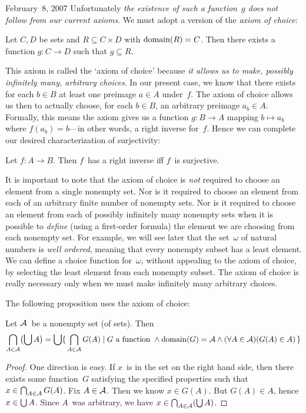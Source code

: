 \begin{lecture}{February~8, 2007}
Unfortunately \emph{the existence of such a function~\(g\) does not follow from our current axioms}. We must adopt a version of the \emph{axiom of choice}:
\begin{axm}[Choice]
Let \(C,D\) be sets and \(R\subseteq C\times D\) with \(\operatorname{domain}(R)=C\). Then there exists a function \(g:C\to D\) such that \(g\subseteq R\).
\end{axm}
\noindent This axiom is called the `axiom of choice' because \emph{it allows us to make, possibly infinitely many, arbitrary choices}. In our present case, we know that there exists for each \(b\in B\) at least one preimage \(a\in A\) under~\(f\). The axiom of choice allows us then to actually choose, for each \(b\in B\), an arbitrary preimage \(a_b\in A\). Formally, this means the axiom gives us a function \(g:B\to A\) mapping \(b\mapsto a_b\) where \(f(a_b)=b\)---in other words, a right inverse for~\(f\). Hence we can complete our desired characterization of surjectivity:
\begin{thm}
Let \(f:A\to B\). Then \(f\)~has a right inverse iff \(f\)~is surjective.
\end{thm}
\begin{rmk}
It is important to note that the axiom of choice is \emph{not} required to choose an element from a single nonempty set. Nor is it required to choose an element from each of an arbitrary finite number of nonempty sets. Nor is it required to choose an element from each of possibly infinitely many nonempty sets when it is possible to \emph{define} (using a first-order formula) the element we are choosing from each nonempty set. For example, we will see later that the set~\(\omega\) of natural numbers is \emph{well ordered}, meaning that every nonempty subset has a least element. We can define a choice function for~\(\omega\), without appealing to the axiom of choice, by selecting the least element from each nonempty subset. The axiom of choice is really necessary only when we must make infinitely many arbitrary choices.
\end{rmk}
The following proposition uses the axiom of choice:
\begin{prop}
Let \(\mathcal{A}\)~be a nonempty set (of sets). Then
\[\bigcap_{A\in\mathcal{A}}\bigl(\bigcup A\bigr)=\bigcup\{\,\bigcap_{A\in\mathcal{A}} G(A)\mid G\text{ a function }\land\operatorname{domain}(G)=\mathcal{A}\land(\forall A\in\mathcal{A})(G(A)\in A)\,\}\]
\end{prop}
\begin{proof}
One direction is easy. If \(x\)~is in the set on the right hand side, then there exists some function~\(G\) satisfying the specified properties such that \(x\in\bigcap_{A\in\mathcal{A}} G(A)\). Fix \(A\in\mathcal{A}\). Then we know \(x\in G(A)\). But \(G(A)\in A\), hence \(x\in\bigcup A\). Since \(A\)~was arbitrary, we have \(x\in\bigcap_{A\in\mathcal{A}}(\bigcup A)\).


\end{proof}
\end{lecture}
